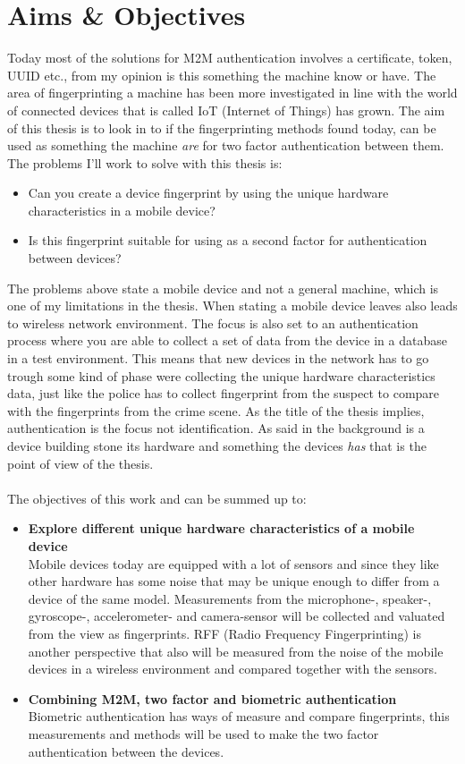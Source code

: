 \section{Aims \& Objectives}\label{sec:aim}
Today most of the solutions for M2M authentication involves a certificate, token, UUID etc., from my opinion is this something the machine know or have. The area of fingerprinting a machine has been more investigated in line with the world of connected devices that is called IoT (Internet of Things) has grown. The aim of this thesis is to look in to if the fingerprinting methods found today, can be used as something the machine \textit{are} for two factor authentication between them. The problems I'll work to solve with this thesis is:
\begin{itemize}
	\item[] Can you create a device fingerprint by using the unique hardware characteristics in a mobile device?
	\item[] Is this fingerprint suitable for using as a second factor for authentication between devices?
\end{itemize}
The problems above state a mobile device and not a general machine, which is one of my limitations in the thesis. When stating a mobile device leaves also leads to wireless network environment. The focus is also set to an authentication process where you are able to collect a set of data from the device in a database in a test environment. This means that new devices in the network has to go trough some kind of phase were collecting the unique hardware characteristics data, just like the police has to collect fingerprint from the suspect to compare with the fingerprints from the crime scene. As the title of the thesis implies, authentication is the focus not identification. As said in the background is a device building stone its hardware and something the devices \textit{has} that is the point of view of the thesis. \\
\\
The objectives of this work and can be summed up to:
\begin{itemize}
	\item[] \textbf{Explore different unique hardware characteristics of a mobile device} \\
	Mobile devices today are equipped with a lot of sensors and since they like other hardware has some noise that may be unique enough to differ from a device of the same model. Measurements from the microphone-, speaker-, gyroscope-, accelerometer- and camera-sensor will be collected and valuated from the view as fingerprints. RFF (Radio Frequency Fingerprinting) is another perspective that also will be measured from the noise of the mobile devices in a wireless environment and compared together with the sensors.
	\item[] \textbf{Combining M2M, two factor and biometric authentication} \\
	Biometric authentication has ways of measure and compare fingerprints, this measurements and methods will be used to make the two factor authentication between the devices.
\end{itemize}

